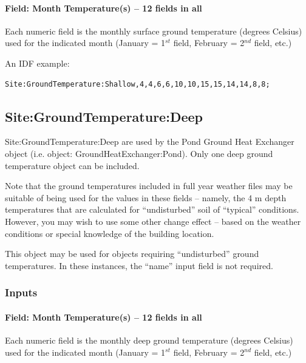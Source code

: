 \paragraph{Field: Month Temperature(s) -- 12 fields in all}\label{field-month-temperatures-12-fields-in-all-1}

Each numeric field is the monthly surface ground temperature (degrees Celsius) used for the indicated month (January = 1\(^{st}\) field, February = 2\(^{nd}\) field, etc.)

An IDF example:

\begin{lstlisting}
Site:GroundTemperature:Shallow,4,4,6,6,10,10,15,15,14,14,8,8;
\end{lstlisting}

\subsection{Site:GroundTemperature:Deep}\label{sitegroundtemperaturedeep}

Site:GroundTemperature:Deep are used by the Pond Ground Heat Exchanger object (i.e. object: GroundHeatExchanger:Pond). Only one deep ground temperature object can be included.

\begin{callout}
Note that the ground temperatures included in full year weather files may be suitable of being used for the values in these fields -- namely, the 4 m depth temperatures that are calculated for ``undisturbed'' soil of ``typical'' conditions. However, you may wish to use some other change effect -- based on the weather conditions or special knowledge of the building location.
\end{callout}

This object may be used for objects requiring ``undisturbed'' ground temperatures. In these instances, the ``name'' input field is not required.

\subsubsection{Inputs}\label{inputs-13-007}

\paragraph{Field: Month Temperature(s) -- 12 fields in all}\label{field-month-temperatures-12-fields-in-all-2}

Each numeric field is the monthly deep ground temperature (degrees Celsius) used for the indicated month (January = 1\(^{st}\) field, February = 2\(^{nd}\) field, etc.)

